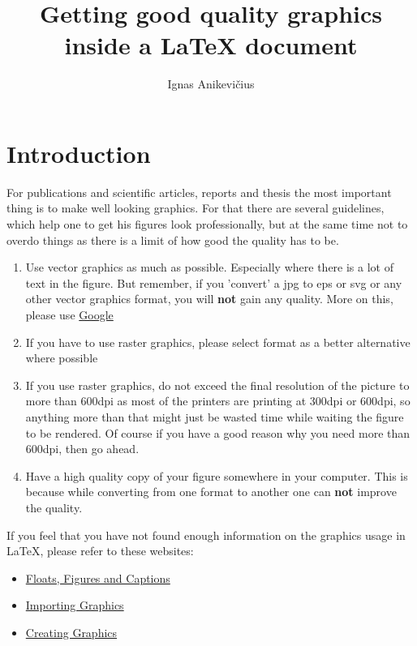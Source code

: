 \documentclass[
]{scrartcl}
\title{Getting good quality graphics inside a \LaTeX{} document}
\author{Ignas Anikevičius}
\begin{document}

\maketitle
\tableofcontents
\listoftodos

\clearpage
\section{Introduction}

%
For publications and scientific articles, reports and thesis the most important
    thing is to make well looking graphics. 
%
For that there are several guidelines, which help one to get his figures look
    professionally, but at the same time not to overdo things as there is a
    limit of how good the quality has to be.

\begin{enumerate}
    \item Use vector graphics as much as possible. Especially where there is a
        lot of text in the figure. But remember, if you 'convert' a jpg to eps
        or svg or any other vector graphics format, you will \textbf{not} gain
        any quality. More on this, please use
        \href{http://www.google.co.uk}{Google}
    \item If you have to use raster graphics, please select  format as
        a better alternative where possible
    \item If you use raster graphics, do not exceed the final resolution of the
        picture to more than 600dpi as most of the printers are printing at
        300dpi or 600dpi, so anything more than that might just be wasted time
        while waiting the figure to be rendered. Of course if you have a good
        reason why you need more than 600dpi, then go ahead.
    \item Have a high quality copy of your figure somewhere in your computer.
        This is because while converting from one format to another one can
        \textbf{not} improve the quality.
\end{enumerate}

If you feel that you have not found enough information on the graphics usage in
\LaTeX, please refer to these websites:
\begin{itemize}
    \item
        \href{https://secure.wikimedia.org/wikibooks/en/wiki/LaTeX/Floats,_Figures_and_Captions}{Floats,
        Figures and Captions}
    \item
        \href{https://secure.wikimedia.org/wikibooks/en/wiki/LaTeX/Importing_Graphics}{Importing
        Graphics}
    \item
        \href{https://secure.wikimedia.org/wikibooks/en/wiki/LaTeX/Creating_Graphics}{Creating
        Graphics}
\end{itemize}
\end{document}

